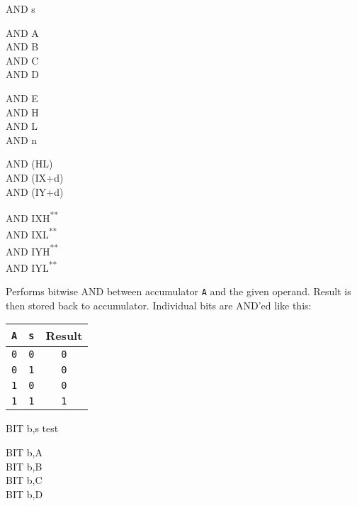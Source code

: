 \documentclass[12pt,twoside,openright,a4paper]{book}
\newcommand{\UNDOC}{\textnormal{\textsuperscript{**}}}
\begin{document}
\begin{basedescript}{
	\desclabelstyle{\multilinelabel}
	\desclabelwidth{3cm}}
\begin{DetailItem}{AND s}
		\begin{DetailVariants}[4]
			AND A\\
			AND B\\
			AND C\\
			AND D

			\columnbreak
			AND E\\
			AND H\\
			AND L\\
			AND n
			
			\columnbreak
			AND (HL)\\
			AND (IX+d)\\
			AND (IY+d)

			\columnbreak
			AND IXH\UNDOC\\
			AND IXL\UNDOC\\
			AND IYH\UNDOC\\
			AND IYL\UNDOC
		\end{DetailVariants}

		Performs bitwise AND between accumulator {\tt A} and the given operand. Result is then stored back to accumulator. Individual bits are AND'ed like this:

		\begin{tabular}{cc|c}
			{\tt A} & {\tt s} & Result \\
			\hline
			{\tt 0} & {\tt 0} & {\tt 0} \\
			{\tt 0} & {\tt 1} & {\tt 0} \\
			{\tt 1} & {\tt 0} & {\tt 0} \\
			{\tt 1} & {\tt 1} & {\tt 1} \\
		\end{tabular}

		\begin{DetailEffects}[v]
			\FlagsANDr
		\end{DetailEffects}

		\begin{DetailTiming}
		\end{DetailTiming}

	\end{DetailItem}

	\pagebreak
	\begin{DetailItem}{BIT b,s}
		{test }
		{}

		\begin{DetailVariants}
			BIT b,A\\
			BIT b,B\\
			BIT b,C\\
			BIT b,D


\end{DetailVariants}
\end{DetailItem}
\end{basedescript}
\end{document}
